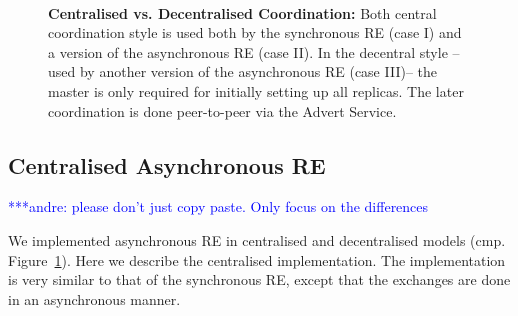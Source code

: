 \documentclass{rspublic}
\newcommand{\alnote}[1]{ {\textcolor{blue} { ***andre: #1 }}}
\newcommand{\alnote}[1]{}
\begin{document}
\begin{figure}%
\centering
{}\qquad
{}\\
\caption{\textbf{Centralised vs. Decentralised Coordination:} Both central coordination style
is used both by the synchronous RE (case I) and a version of the asynchronous RE (case II). 
In the decentral style -- used by another version of the asynchronous RE (case III)-- the master is only required
for initially setting up all replicas. The later coordination is done peer-to-peer via the Advert Service.}
\label{fig:coordination}
\end{figure}


\subsection{Centralised Asynchronous RE}
\alnote{please don't just copy paste. Only focus on the differences}

We implemented asynchronous RE in centralised and decentralised models 
(cmp. Figure~\ref{fig:coordination}). Here we describe the centralised 
implementation. The implementation is very similar to that of the 
synchronous RE, except that the exchanges are done in an asynchronous manner. 
\end{document}
